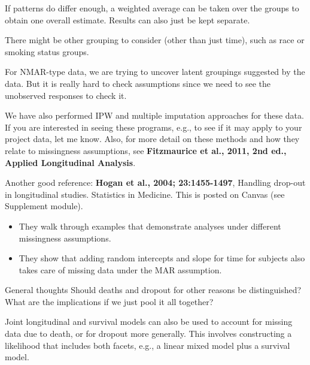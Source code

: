 \documentclass[
  9pt,
  ignorenonframetext,
]{beamer}
\begin{document}
\begin{frame}{}
\protect\hypertarget{section-18}{}
If patterns do differ enough, a weighted average can be taken over the
groups to obtain one overall estimate. Results can also just be kept
separate.

There might be other grouping to consider (other than just time), such
as race or smoking status groups.

For NMAR-type data, we are trying to uncover latent groupings suggested
by the data. But it is really hard to check assumptions since we need to
see the unobserved responses to check it.

We have also performed IPW and multiple imputation approaches for these
data. If you are interested in seeing these programs, e.g., to see if it
may apply to your project data, let me know. Also, for more detail on
these methods and how they relate to missingness assumptions, see
\textbf{Fitzmaurice et al., 2011, 2nd ed., Applied Longitudinal
Analysis}.

Another good reference: \textbf{Hogan et al., 2004; 23:1455-1497},
Handling drop-out in longitudinal studies. Statistics in Medicine. This
is posted on Canvas (see Supplement module).

\begin{itemize}
\item
  They walk through examples that demonstrate analyses under different
  missingness assumptions.
\item
  They show that adding random intercepts and slope for time for
  subjects also takes care of missing data under the MAR assumption.
\end{itemize}
\end{frame}

\begin{frame}{General thoughts}
\protect\hypertarget{general-thoughts}{}
Should deaths and dropout for other reasons be distinguished? What are
the implications if we just pool it all together?

Joint longitudinal and survival models can also be used to account for
missing data due to death, or for dropout more generally. This involves
constructing a likelihood that includes both facets, e.g., a linear
mixed model plus a survival model.
\end{frame}
\end{document}
